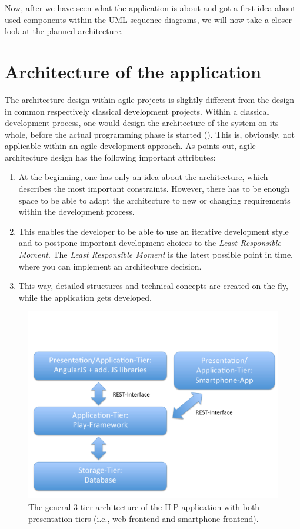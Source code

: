 \clearpage

Now, after we have seen what the application is about and got a first idea about used components within the \ac{UML} sequence diagrams, we will now take a closer look at the planned architecture.

\section{Architecture of the application}
\label{architecture}
The architecture design within agile projects is slightly different from the design in common respectively classical development projects. Within a classical development process, one would design the architecture of the system on its whole, before the actual programming phase is started (\cite{Patterns:2009aa}). This is, obviously, not applicable within an agile development approach. As \cite{Mast2013} points out, agile architecture design has the following important attributes:

\begin{enumerate}
	\item At the beginning, one has only an idea about the architecture, which describes the most important constraints. However, there has to be enough space to be able to adapt the architecture to new or changing requirements within the development process.
	\item This enables the developer to be able to use an iterative development style and to postpone important development choices to the \textit{Least Responsible Moment}. The \textit{Least Responsible Moment} is the latest possible point in time, where you can implement an architecture decision.
	\item This way, detailed structures and technical concepts are created on-the-fly, while the application gets developed.
\end{enumerate}

\begin{figure}[th]
\centerline{\includegraphics[width=1\textwidth]{gfx/architecture}}
\caption{The general 3-tier architecture of the HiP-application with both presentation tiers (i.e., web frontend and smartphone frontend).}
\label{hip:architecture}
\end{figure}

